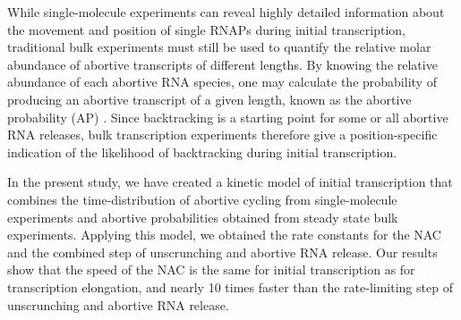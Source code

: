 While single-molecule experiments can reveal highly detailed information about
the movement and position of single RNAPs during initial transcription,
traditional bulk experiments must still be used to quantify the relative molar
abundance of abortive transcripts of different lengths. By knowing the
relative abundance of each abortive RNA species, one may calculate the
probability of producing an abortive transcript of a given length, known as
the abortive probability (AP) \cite{hsu_promoter_2002, hsu_quantitative_1996}.
Since backtracking is a starting point for some or all abortive RNA releases,
bulk transcription experiments therefore give a position-specific indication
of the likelihood of backtracking during initial transcription.

In the present study, we have created a kinetic model of initial transcription
that combines the time-distribution of abortive cycling from single-molecule
experiments and abortive probabilities obtained from steady state bulk
experiments. Applying this model, we obtained the rate constants for the NAC
and the combined step of unscrunching and abortive RNA release. Our results
show that the speed of the NAC is the same for initial transcription as
for transcription elongation, and nearly 10 times faster than the rate-limiting
step of unscrunching and abortive RNA release.
